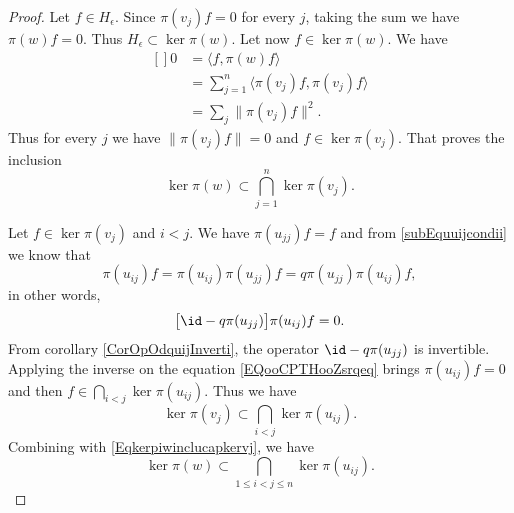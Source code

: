 \begin{proof}
    Let $f\in H_{\epsilon}$. Since $\pi(v_j)f=0$ for every $j$, taking the sum we have $\pi(w)f=0$. Thus \( H_{\epsilon}\subset\ker\pi(w)\). Let now $f\in\ker\pi(w)$. We have
    \begin{equation}
        \begin{aligned}[]
            0&=\langle f, \pi(w)f\rangle \\
            &=\sum_{j=1}^n\langle \pi(v_j)f, \pi(v_j)f\rangle \\
            &=\sum_j\| \pi(v_j)f \|^2.
        \end{aligned}
    \end{equation}
    Thus for every $j$ we have $\| \pi(v_j)f \|=0$ and $f\in\ker\pi(v_j)$. That proves the inclusion
    \begin{equation}        \label{Eqkerpiwinclucapkervj}
        \ker\pi(w)\subset\bigcap_{j=1}^n\ker\pi(v_j).
    \end{equation}

    Let $f\in\ker\pi(v_j)$ and \( i<j\). We have $\pi(u_{jj})f=f$ and from \eqref{subEquuijcondii} we know that
    \begin{equation}
        \pi(u_{ij})f=\pi(u_{ij})\pi(u_{jj})f=q\pi(u_{jj})\pi(u_{ij})f,
    \end{equation}
    in other words,
    \begin{equation}        \label{EQooCPTHooZsrqeq}
        \big[ \id-q\pi(u_{jj}) \big]\pi(u_{ij})f=0.
    \end{equation}
    From corollary \ref{CorOpOdquijInverti}, the operator $\id-q\pi(u_{jj})$ is invertible. Applying the inverse on the equation \eqref{EQooCPTHooZsrqeq} brings $\pi(u_{ij})f=0$ and then $f\in\bigcap_{i<j}\ker\pi(u_{ij})$. Thus we have
    \begin{equation}        \label{Eqketpivjsubipyjketpiuij}
        \ker\pi(v_j)\subset\bigcap_{i<j}\ker\pi(u_{ij}).
    \end{equation}
    Combining with \eqref{Eqkerpiwinclucapkervj}, we have
    \begin{equation}        \label{EqIntSubSintkerkera}
        \ker\pi(w)\subset\bigcap_{1\leq i<j\leq n}\ker\pi(u_{ij}).
    \end{equation}


\end{proof}
